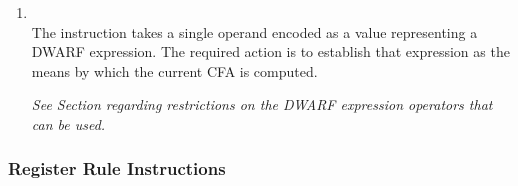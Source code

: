 \begin{enumerate}[1. ]
\item \textbf{\DWCFAdefcfaexpressionTARG} \\
The \DWCFAdefcfaexpressionNAME{} instruction takes a 
single operand encoded as a 
\DWFORMexprloc{} value representing a
DWARF expression. The required action is to establish that
expression as the means by which the current CFA is computed.

\textit{See Section  
regarding restrictions on the DWARF
expression operators that can be used.}

\end{enumerate}

\subsubsection{Register Rule Instructions}
\label{chap:registerruleinstructions}
